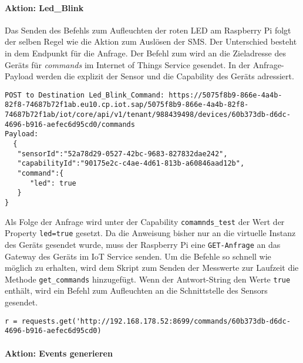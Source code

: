 \paragraph{Aktion: Led\_Blink}

Das Senden des Befehls zum Aufleuchten der roten LED am Raspberry Pi folgt der selben Regel wie die Aktion zum Auslösen der SMS. Der Unterschied besteht in dem Endpunkt für die Anfrage. Der Befehl zum wird an die Zieladresse des Geräts für \textit{commands} im Internet of Things Service gesendet. In der Anfrage-Payload werden die explizit der Sensor und die Capability des Geräts adressiert. 
\newline
\begin{lstlisting}[caption= POST-Anfrage zum Senden den Befehls]
POST to Destination Led_Blink_Command: https://5075f8b9-866e-4a4b-82f8-74687b72f1ab.eu10.cp.iot.sap/5075f8b9-866e-4a4b-82f8-74687b72f1ab/iot/core/api/v1/tenant/988439498/devices/60b373db-d6dc-4696-b916-aefec6d95cd0/commands
Payload:
  {
   "sensorId":"52a78d29-0527-42bc-9683-827832dae242",
   "capabilityId":"90175e2c-c4ae-4d61-813b-a60846aad12b",
   "command":{
      "led": true
   }
}
\end{lstlisting}

\noindent Als Folge der Anfrage wird unter der Capability \texttt{comamnds\_test} der Wert der Property \texttt{led=true} gesetzt. Da die Anweisung bisher nur an die virtuelle Instanz des Geräts gesendet wurde, muss der Raspberry Pi eine \texttt{GET-Anfrage} an das Gateway des Geräts im IoT Service senden. Um die Befehle so schnell wie möglich zu erhalten, wird dem Skript zum Senden der Messwerte zur Laufzeit die Methode \texttt{get\_commands} hinzugefügt. Wenn der Antwort-String den Werte \texttt{true} enthält, wird ein Befehl zum Aufleuchten an die Schnittstelle des Sensors gesendet.  
\newline
\begin{lstlisting}[caption= GET-Anfrage für Commands an das Gateway ]
  r = requests.get('http://192.168.178.52:8699/commands/60b373db-d6dc-4696-b916-aefec6d95cd0)
\end{lstlisting}

\paragraph{Aktion: Events generieren}

